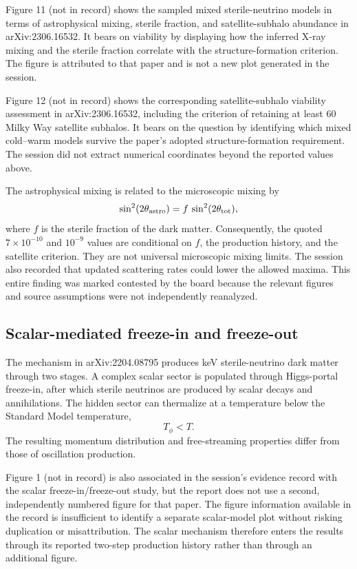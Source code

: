 \documentclass[11pt,a4paper]{article}
\begin{document}
Figure 11 (not in record) shows the sampled mixed sterile-neutrino models in terms of astrophysical mixing, sterile fraction, and satellite-subhalo abundance in arXiv:2306.16532. It bears on viability by displaying how the inferred X-ray mixing and the sterile fraction correlate with the structure-formation criterion. The figure is attributed to that paper and is not a new plot generated in the session.



Figure 12 (not in record) shows the corresponding satellite-subhalo viability assessment in arXiv:2306.16532, including the criterion of retaining at least 60 Milky Way satellite subhalos. It bears on the question by identifying which mixed cold--warm models survive the paper's adopted structure-formation requirement. The session did not extract numerical coordinates beyond the reported values above.

The astrophysical mixing is related to the microscopic mixing by
\[
\sin^2(2\theta_{\rm astro})
=
f\,\sin^2(2\theta_{\rm tot}),
\]
where \(f\) is the sterile fraction of the dark matter. Consequently, the quoted \(7\times10^{-10}\) and \(10^{-9}\) values are conditional on \(f\), the production history, and the satellite criterion. They are not universal microscopic mixing limits. The session also recorded that updated scattering rates could lower the allowed maxima. This entire finding was marked contested by the board because the relevant figures and source assumptions were not independently reanalyzed.

\subsection{Scalar-mediated freeze-in and freeze-out}

The mechanism in arXiv:2204.08795 produces keV sterile-neutrino dark matter through two stages. A complex scalar sector is populated through Higgs-portal freeze-in, after which sterile neutrinos are produced by scalar decays and annihilations. The hidden sector can thermalize at a temperature below the Standard Model temperature,
\[
T_\phi<T.
\]
The resulting momentum distribution and free-streaming properties differ from those of oscillation production.



Figure 1 (not in record) is also associated in the session's evidence record with the scalar freeze-in/freeze-out study, but the report does not use a second, independently numbered figure for that paper. The figure information available in the record is insufficient to identify a separate scalar-model plot without risking duplication or misattribution. The scalar mechanism therefore enters the results through its reported two-step production history rather than through an additional figure.
\end{document}
